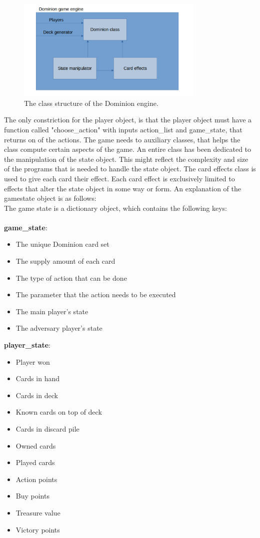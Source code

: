 \begin{figure}[H]
    \centering
    \includegraphics[width=0.8\textwidth]{img/Dominion_game_structure.png}
    \caption{The class structure of the Dominion engine.}
    \label{fig:Dominion_engine}
\end{figure}

The only constriction for the player object, is that the player object must have a function called "choose\_action" with inputs action\_list and game\_state, that returns on of the actions.
The game needs to auxiliary classes, that helps the class compute certain aspects of the game. An entire class has been dedicated to the manipulation of the state object. This might reflect the complexity and size of the programs that is needed to handle the state object.
The card effects class is used to give each card their effect. Each card effect is exclusively limited to effects that alter the state object in some way or form.
An explanation of the gamestate object is as follows:\\
The game state is a dictionary object, which contains the following keys:\\\\
\textbf{game\_state}:
\begin{itemize}
    \item The unique Dominion card set
    \item The supply amount of each card
    \item The type of action that can be done
    \item The parameter that the action needs to be executed
    \item The main player's state
    \item The adversary player's state
\end{itemize}

\textbf{player\_state}:
\begin{itemize}
    \item Player won
    \item Cards in hand
    \item Cards in deck
    \item Known cards on top of deck
    \item Cards in discard pile
    \item Owned cards
    \item Played cards
    \item Action points
    \item Buy points
    \item Treasure value
    \item Victory points
\end{itemize}

